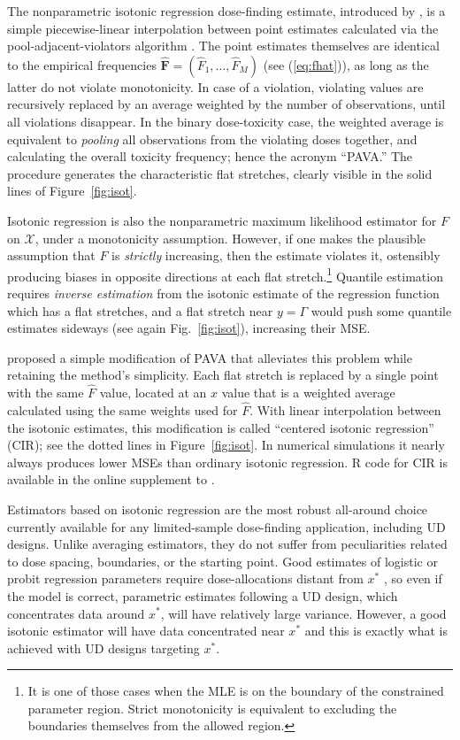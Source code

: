 The nonparametric isotonic regression dose-finding estimate, introduced by \cite{Styl:Flou:dose:2002}, is a simple piecewise-linear interpolation between point estimates calculated via the pool-adjacent-violators algorithm \citep[PAVA,][]{BBBB:order:1972}. The point estimates themselves are identical to the empirical frequencies $\mathbf{\hat{F}}=\left(\hat{F}_1,\ldots,\hat{F}_M\right)$ (see (\ref{eq:fhat})), as long as the latter do not violate monotonicity. In case of a violation, violating values are recursively replaced by an average weighted by the number of observations, until all violations disappear. In the binary dose-toxicity case, the weighted average is equivalent to \emph{pooling} all observations from the violating doses together, and calculating the overall toxicity frequency; hence the acronym ``PAVA.'' The procedure generates the characteristic flat stretches, clearly visible in the solid lines of Figure~\ref{fig:isot}.

 Isotonic regression is also the nonparametric maximum likelihood estimator for $F$ on $\mathcal{X}$, under a monotonicity assumption. However, if one makes the plausible assumption that $F$ is \emph{strictly} increasing, then the estimate violates it, ostensibly producing biases in opposite directions at each flat stretch.\footnote{It is one of those cases when the MLE is on the boundary of the constrained parameter region. Strict monotonicity is equivalent to excluding the boundaries themselves from the allowed region.} Quantile estimation requires \emph{inverse estimation} from the isotonic estimate of the regression function which has a flat stretches, and a flat stretch near $y=\Gamma$ would push some quantile estimates sideways (see again Fig.~\ref{fig:isot}), increasing their MSE.

 \cite{Oron07} proposed a simple modification of PAVA that alleviates this problem while retaining the method's simplicity. Each flat stretch is replaced by a single point with the same $\hat{F}$ value, located at an $x$ value that is a weighted average calculated using the same weights used for $\hat{F}$. With linear interpolation between the isotonic estimates, this modification is called ``centered isotonic regression'' (CIR); see the dotted lines in Figure~\ref{fig:isot}. In numerical simulations it nearly always produces lower MSEs than ordinary isotonic regression. R code for CIR is available in the online supplement to \cite{Oron:Hoff:smal:2013}.

Estimators based on isotonic regression are the most robust all-around choice currently available for any limited-sample dose-finding application, including UD designs. Unlike averaging estimators, they do not suffer from peculiarities related to dose spacing, boundaries, or the starting point. Good estimates of logistic or probit regression parameters require dose-allocations distant from $x^*$ \citep{}, so even if the model is correct, parametric estimates following a UD design, which concentrates data around $x^*$, will have relatively large variance. However, a good isotonic estimator will have data concentrated near $x^*$ and this is exactly what is achieved with UD designs targeting $x^*$.

